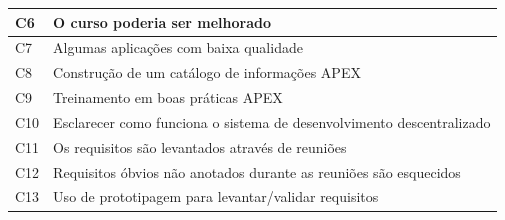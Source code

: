 \begin{longtable}{|M{1.3cm} | m{14.0cm}|}
C6             & O curso poderia ser melhorado                                                                                                                                                                                                                                     \\ \hline
C7             & Algumas aplicações com baixa qualidade                                                                                                                                                                                                                            \\ \hline
C8             & Construção de um catálogo de informações APEX                                                                                                                                                                                                                     \\ \hline
C9             & Treinamento em boas práticas APEX                                                                                                                                                                                                                                 \\ \hline
C10            & Esclarecer como funciona o sistema de desenvolvimento descentralizado                                                                                                                                                                                             \\ \hline
C11            & Os requisitos são levantados através de reuniões                                                                                                                                                                                                                  \\ \hline
C12            & Requisitos óbvios não anotados durante as reuniões são esquecidos                                                                                                                                                                                                 \\ \hline
C13            & Uso de prototipagem para levantar/validar requisitos                                                                                                                                                                                                              \\ \hline

\end{longtable}
